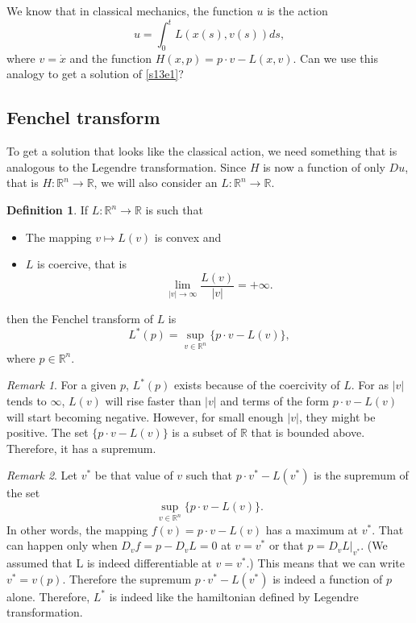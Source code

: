 \documentclass{article}
\theoremstyle{plain}
\numberwithin{thm}{section}
\theoremstyle{plain}
\numberwithin{prop}{section}
\theoremstyle{definition}
\newtheorem{defn}{Definition}
\numberwithin{defn}{section}
\theoremstyle{remark}
\newtheorem*{rem}{Remark}
\numberwithin{equation}{section}
\begin{document}
We know that in classical mechanics, the function $u$ is the action
\[
u = \int_0^t L(x(s), v(s))ds,
\]
where $v = \dot{x}$ and the function $H(x, p) = p\cdot v - L(x, v)$. Can we use this analogy to
get a solution of \eqref{s13e1}? 

\subsection{Fenchel transform}
To get a solution that looks like the classical action, we need something that is analogous to the 
Legendre transformation. Since $H$ is now a function of only $Du$, that is $H: \mathbb{R}^n 
\rightarrow \mathbb{R}$, we will also consider an $L: \mathbb{R}^n \rightarrow \mathbb{R}$.
\begin{defn}\label{s13d1}
If $L: \mathbb{R}^n \rightarrow \mathbb{R}$ is such that
\begin{itemize}
\item The mapping $v \mapsto L(v)$ is convex and
\item $L$ is coercive, that is
\[
\lim_{|v| \rightarrow \infty} \frac{L(v)}{|v|} = +\infty.
\]
\end{itemize}
then the Fenchel transform of $L$ is 
\[
L^\ast(p) = \sup_{v \in \mathbb{R}^n}\{p\cdot v - L(v)\},
\]
where $p \in \mathbb{R}^n$.
\end{defn}
\begin{rem}
For a given $p$, $L^\ast(p)$ exists because of the coercivity of $L$. For as $|v|$ tends to $\infty$,
$L(v)$ will rise faster than $|v|$ and terms of the form $p\cdot v - L(v)$ will start becoming 
negative. However, for small enough $|v|$, they might be positive. The set $\{p\cdot v - L(v)\}$ is
a subset of $\mathbb{R}$ that is bounded above. Therefore, it has a supremum.
\end{rem}

\begin{rem}
Let $v^\ast$ be that value of $v$ such that $p \cdot v^\ast - L(v^\ast)$ is the supremum of the
set 
\[
\sup_{v \in \mathbb{R}^n}\{p\cdot v - L(v)\}.
\]
In other words, the mapping $f(v) = p \cdot v - L(v)$ has a maximum at $v^\ast$. That can happen only
when $D_v f = p - D_v L = 0$ at $v = v^\ast$ or that $p = D_v L|_{v^\ast}$. (We assumed that L is
indeed differentiable at $v = v^\ast$.) This means that we can write $v^\ast = v(p)$. Therefore the 
supremum $p \cdot v^\ast - L(v^\ast)$ is indeed a function of $p$ alone. Therefore, $L^\ast$ is 
indeed like the hamiltonian defined by Legendre transformation.
\end{rem}
\end{document}
